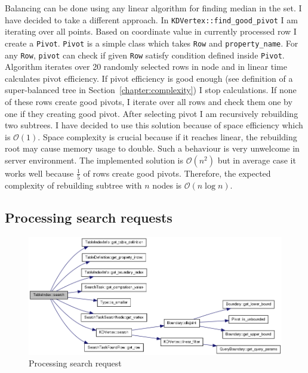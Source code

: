 \documentclass[10pt,a4paper]{article}
\newcommand{\Oh}{\mathcal{O}}
\begin{document}
Balancing can be done using any linear algorithm for finding median in the set. I have decided to take a different approach. In \verb|KDVertex::find_good_pivot| I am iterating over all points. Based on coordinate value in currently processed row I create a \verb|Pivot|. \verb|Pivot| is a simple class which takes \verb|Row| and \verb|property_name|. For any \verb|Row|, \verb|pivot| can check if given \verb|Row| satisfy condition defined inside \verb|Pivot|. Algorithm iterates over 20 randomly selected rows in node and in linear time calculates pivot efficiency. If pivot efficiency is good enough (see definition of a super-balanced tree in Section~\ref{chapter:complexity}) I stop calculations. If none of these rows create good pivots, I iterate over all rows and check them one by one if they creating good pivot. After selecting pivot I am recursively rebuilding two subtrees. I have decided to use this solution because of space efficiency which is $\Oh(1)$. Space complexity is crucial because if it reaches linear, the rebuilding root may cause memory usage to double. Such a behaviour is very unwelcome in server environment. The implemented solution is $\Oh(n^2)$ but in average case it works well because $\frac{1}{5}$ of rows create good pivots. Therefore, the expected complexity of rebuilding subtree with $n$ nodes is $\Oh(n \log n)$.

\subsection{Processing search requests}

\begin{figure}
\centering
  \includegraphics[width=16cm]{search}
  \caption{Processing search request}
  \label{fig:search}
\end{figure}
\end{document}
